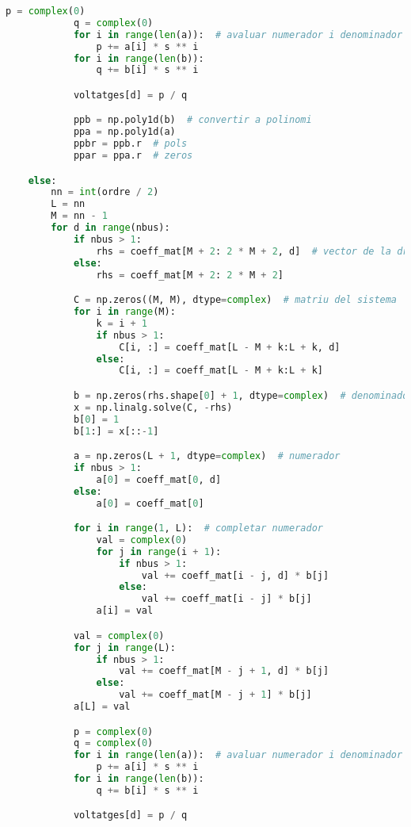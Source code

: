 \begin{lstlisting}[language=Python,numbers=none]
            p = complex(0)
            q = complex(0)
            for i in range(len(a)):  # avaluar numerador i denominador
                p += a[i] * s ** i
            for i in range(len(b)):
                q += b[i] * s ** i

            voltatges[d] = p / q

            ppb = np.poly1d(b)  # convertir a polinomi
            ppa = np.poly1d(a)
            ppbr = ppb.r  # pols
            ppar = ppa.r  # zeros

    else:
        nn = int(ordre / 2)
        L = nn
        M = nn - 1
        for d in range(nbus):
            if nbus > 1:
                rhs = coeff_mat[M + 2: 2 * M + 2, d]  # vector de la dreta, conegut
            else:
                rhs = coeff_mat[M + 2: 2 * M + 2]

            C = np.zeros((M, M), dtype=complex)  # matriu del sistema
            for i in range(M):
                k = i + 1
                if nbus > 1:
                    C[i, :] = coeff_mat[L - M + k:L + k, d]
                else:
                    C[i, :] = coeff_mat[L - M + k:L + k]

            b = np.zeros(rhs.shape[0] + 1, dtype=complex)  # denominador
            x = np.linalg.solve(C, -rhs)
            b[0] = 1
            b[1:] = x[::-1]

            a = np.zeros(L + 1, dtype=complex)  # numerador
            if nbus > 1:
                a[0] = coeff_mat[0, d]
            else:
                a[0] = coeff_mat[0]

            for i in range(1, L):  # completar numerador
                val = complex(0)
                for j in range(i + 1):
                    if nbus > 1:
                        val += coeff_mat[i - j, d] * b[j]
                    else:
                        val += coeff_mat[i - j] * b[j]
                a[i] = val

            val = complex(0)
            for j in range(L):
                if nbus > 1:
                    val += coeff_mat[M - j + 1, d] * b[j]
                else:
                    val += coeff_mat[M - j + 1] * b[j]
            a[L] = val

            p = complex(0)
            q = complex(0)
            for i in range(len(a)):  # avaluar numerador i denominador
                p += a[i] * s ** i
            for i in range(len(b)):
                q += b[i] * s ** i

            voltatges[d] = p / q
            

\end{lstlisting}
